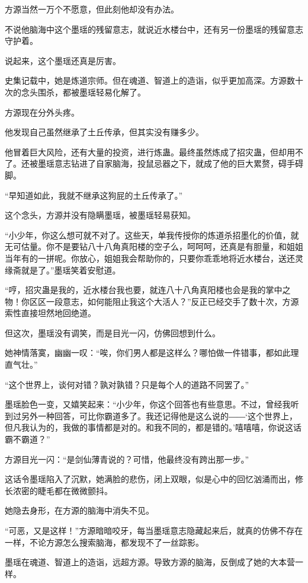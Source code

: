 \begin{this_body}
方源当然一万个不愿意，但此刻他却没有办法。

不说他脑海中这个墨瑶的残留意志，就说近水楼台中，还有另一份墨瑶的残留意志守护着。

说起来，这个墨瑶还真是厉害。

史集记载中，她是炼道宗师。但在魂道、智道上的造诣，似乎更加高深。方源数十次的念头围杀，都被墨瑶轻易化解了。

方源现在分外头疼。

他发现自己虽然继承了土丘传承，但其实没有赚多少。

他冒着巨大风险，还有大量的投资，进行炼蛊。最终虽然炼成了招灾蛊，但却用不了。还被墨瑶意志钻进了自家脑海，投鼠忌器之下，就成了他的巨大累赘，碍手碍脚。

“早知道如此，我就不继承这狗屁的土丘传承了。”

这个念头，方源并没有隐瞒墨瑶，被墨瑶轻易获知。

“小少年，你这么想可就不对了。这些天，单我传授你的炼道杀招墨化的价值，就无可估量。你不是要钻八十八角真阳楼的空子么，呵呵呵，还真是有胆量，和姐姐当年有的一拼呢。你放心，姐姐我会帮助你的，只要你乖乖地将近水楼台，送还灵缘斋就是了。”墨瑶笑着安慰道。

“哼，招灾蛊是我的，近水楼台我也要，就连八十八角真阳楼也会是我的掌中之物！你区区一段意志，如何能阻止我这个大活人？”反正已经交手了数十次，方源索性直接坦然地回绝道。

但这次，墨瑶没有调笑，而是目光一闪，仿佛回想到什么。

她神情落寞，幽幽一叹：“唉，你们男人都是这样么？哪怕做一件错事，都如此理直气壮。”

“这个世界上，谈何对错？孰对孰错？只是每个人的道路不同罢了。”

墨瑶脸色一变，又嬉笑起来：“小少年，你这个回答也有些意思。不过，曾经我听到过另外一种回答，可比你霸道多了。我还记得他是这么说的――‘这个世界上，但凡我认为的，我做的事情都是对的。和我不同的，都是错的。’嘻嘻嘻，你说这话霸不霸道？”

方源目光一闪：“是剑仙薄青说的？可惜，他最终没有跨出那一步。”

这话令墨瑶陷入了沉默，她满脸的悲伤，闭上双眼，似是心中的回忆汹涌而出，修长浓密的睫毛都在微微颤抖。

她隐去身形，在方源的脑海中消失不见。

“可恶，又是这样！”方源暗暗咬牙，每当墨瑶意志隐藏起来后，就真的仿佛不存在一样，不论方源怎么搜索脑海，都发现不了一丝踪影。

墨瑶在魂道、智道上的造诣，远超方源。导致方源的脑海，反倒成了她的大本营一样。


\end{this_body}

